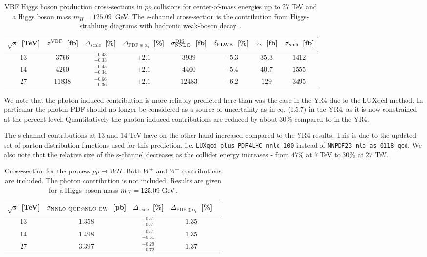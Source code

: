 \begin{table}
\centering
\begin{tabular}{ccccccc|c}
\toprule
$\sqrt{s}$~[TeV] & $\sigma^{\rm VBF}$~[fb] & $\Delta_{\mathrm{scale}}$~[\%] &
$\Delta_{\mathrm{PDF\oplus\alpha_s}}$~[\%] &
$\sigma_{\rm NNLO}^{\rm DIS}$~[fb] & $\delta_{\rm ELWK}$~[\%] & $\sigma_{\gamma}$~[fb] & $\sigma_{\mbox{\scriptsize $s$-ch}}$~[fb]
\\
\midrule
$13$ & $3766$  &$^{+0.43}_{-0.33}$ &$\pm2.1$ &$3939$  & $-5.3$ & $35.3$ & $1412$ \\
$14$ & $4260$  &$^{+0.45}_{-0.34}$ &$\pm2.1$ &$4460$  & $-5.4$ & $40.7$ & $1555$ \\
$27$ & $11838$ &$^{+0.66}_{-0.36}$ &$\pm2.1$ &$12483$ & $-6.2$ & $129$  & $3495$ \\
\bottomrule
\end{tabular}
\caption{VBF Higgs boson production cross-sections in $pp$ collisions for center-of-mass energies
up to 27 TeV and a Higgs boson mass $m_H=125.09$~GeV.  The $s$-channel cross-section is the contribution
from Higgs-strahlung diagrams with hadronic weak-boson decay~\cite{deFlorian:2016spz}.}
\label{tab:vbf_xsec}
\end{table}

We note that the photon induced contribution is more reliably
predicted here than was the case in the YR4 due to the LUXqed
method. In particular the photon PDF should no longer be considered as
a source of uncertainty as in eq. (I.5.7) in the YR4, as it is now
constrained at the percent level. Quantitatively the photon induced
contributions are reduced by about $30\%$ compared to in the YR4.

The s-channel contributions at $13$ and $14$ TeV have on the other
hand increased compared to the YR4 results. This is due to the updated
set of
parton distribution functions used for this prediction,
i.e. \texttt{LUXqed\_plus\_PDF4LHC\_nnlo\_100} instead of
\texttt{NNPDF23\_nlo\_as\_0118\_qed}. We also note that the relative
size of the s-channel decreases as the collider energy increases -
from $47\%$ at $7$ TeV to $30\%$ at $27$ TeV.

 

\label{sec:he-lhc-VH}
\begin{table}
\centering
\begin{tabular}{ccccc}
\toprule
$\sqrt{s}$~[TeV] & $\sigma_{{\rm NNLO~QCD}\otimes{\rm NLO~EW}}$~[pb] & $\Delta_{\mathrm{scale}}$~[\%] &
$\Delta_{\mathrm{PDF\oplus\alpha_s}}$~[\%] \\
\midrule
$13$ & $1.358$ & $^{+0.51}_{-0.51}$ & $1.35$ \\
$14$ & $1.498$ & $^{+0.51}_{-0.51}$ & $1.35$ \\
$27$ & $3.397$ & $^{+0.29}_{-0.72}$ & $1.37$ \\
\bottomrule
\end{tabular}
\caption{Cross-section for the process $p p \to WH$. Both $W^+$ and $W^-$ contributions are included.
The photon contribution is not included. Results are given for a Higgs boson mass $m_H = 125.09~{\rm GeV}$.}
\label{tab:wh_xsec}
\end{table}

